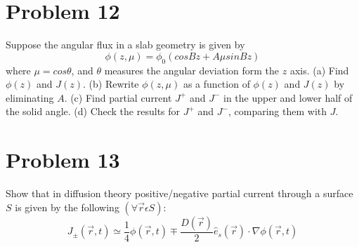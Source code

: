 \documentclass{article}
\begin{document}
\section*{Problem 12}

Suppose the angular flux in a slab geometry is given by
$$\phi(z,\mu) = \phi_{0}(cosBz + A\mu sinBz)$$
where $\mu = cos\theta$, and $\theta$ measures the angular deviation form the $z$ axis.
(a) Find $\phi(z)$ and $J(z)$.
(b) Rewrite $\phi(z,\mu)$ as a function of $\phi(z)$ and $J(z)$ by eliminating $A$.
(c) Find partial current $J^{+}$ and $J^{-}$ in the upper and lower half of the solid angle.
(d) Check the results for $J^{+}$ and $J^{-}$, comparing them with $J$.

\section*{Problem 13}

Show that in diffusion theory positive/negative partial current through a surface $S$ is given by
the following $(\forall \vec{r} \epsilon S)$:
$$J_{\pm}(\vec{r},t) \simeq \frac{1}{4}\phi(\vec{r},t) \mp \frac{D(\vec{r})}{2}\hat{e}_{s}(\vec{r}) \cdot \nabla \phi(\vec{r},t) $$
\end{document}
